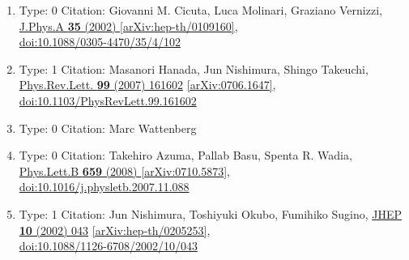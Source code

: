 \documentclass[a4paper,10pt]{article}
\begin{document}
\begin{enumerate}
\begin{enumerate}
  \item Type: 0 Citation: Giovanni M. Cicuta, Luca Molinari, Graziano Vernizzi, \href{https://www.doi.org/10.1088/0305-4470/35/4/102}{J.Phys.A {\bf 35} (2002) }  \href{https://arxiv.org/abs/hep-th/0109160}{[arXiv:hep-th/0109160]},\\\href{https://www.doi.org/10.1088/0305-4470/35/4/102}{doi:10.1088/0305-4470/35/4/102}
  \item Type: 1 Citation: Masanori Hanada, Jun Nishimura, Shingo Takeuchi, \href{https://www.doi.org/10.1103/PhysRevLett.99.161602}{Phys.Rev.Lett. {\bf 99} (2007) 161602}  \href{https://arxiv.org/abs/0706.1647}{[arXiv:0706.1647]},\\\href{https://www.doi.org/10.1103/PhysRevLett.99.161602}{doi:10.1103/PhysRevLett.99.161602}
  \item Type: 0 Citation: Marc Wattenberg
  \item Type: 0 Citation: Takehiro Azuma, Pallab Basu, Spenta R. Wadia, \href{https://www.doi.org/10.1016/j.physletb.2007.11.088}{Phys.Lett.B {\bf 659} (2008) }  \href{https://arxiv.org/abs/0710.5873}{[arXiv:0710.5873]},\\\href{https://www.doi.org/10.1016/j.physletb.2007.11.088}{doi:10.1016/j.physletb.2007.11.088}
  \item Type: 1 Citation: Jun Nishimura, Toshiyuki Okubo, Fumihiko Sugino, \href{https://www.doi.org/10.1088/1126-6708/2002/10/043}{JHEP {\bf 10} (2002) 043}  \href{https://arxiv.org/abs/hep-th/0205253}{[arXiv:hep-th/0205253]},\\\href{https://www.doi.org/10.1088/1126-6708/2002/10/043}{doi:10.1088/1126-6708/2002/10/043}

\end{enumerate}
\end{enumerate}
\end{document}
